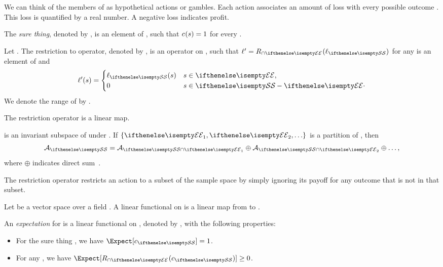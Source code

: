 We can think of the members of \actionSet as hypothetical actions or gambles.
Each action associates an amount of loss with every possible outcome \inS.
This loss is quantified by a real number.
A negative loss indicates profit.

\begin{definition} 
    The \emph{sure thing}, denoted by \sure[], is an element of \actionSet, such that $\sure[](s) = 1$ for every \inS.
\end{definition}

\begin{definition}
    Let \eventInS.
    The restriction to \event operator, denoted by \rstOp, is an operator on \actionSet,
    such that $\actAlt[ ] = \rstOp(\act)$ for any \inA{\act} is an element of \actionSet and
    \[
        \actAlt[ ](s) =
        \begin{cases}
            \act(s)       & s \in \event, \\
            0       & s \in \sampleSet - \event \cdot
        \end{cases}
    \]
    We denote the range of \rstOp by \rstActionSet.
\end{definition}

\begin{proposition}
    The restriction operator is a linear map.
\end{proposition}

\begin{proposition}
    \rstActionSet is an invariant subspace of \actionSet under \rstOp.
    If $\{\event[1], \event[2], \ldots \}$ is a partition of \sampleSet, then
    \[
        \actionSet = \rstActionSet[1] \oplus \rstActionSet[2] \oplus \ldots,
    \]
    where $\oplus$ indicates direct sum~\cite{axler}.
\end{proposition}

The restriction operator restricts an action to a subset of the sample space by simply ignoring its payoff
for any outcome that is not in that subset.

\begin{definition} 
    Let  be a vector space over a field .
    A linear functional on  is a linear map from  to .
\end{definition}

\begin{definition} [Expectation]
    An \emph{expectation} for \sampleSet is a linear functional on \actionSet, denoted by \Expect, with the
    following properties:
    \begin{itemize}
        \item For the sure thing \sure, we have $\Expect[{\sure}] = 1$.
        \item For any \eventInS, we have $\Expect[\rstOp(\sure)] \geq 0$.
    \end{itemize}
\end{definition}

